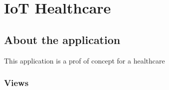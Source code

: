 
\chapter{IoT Healthcare} %

\label{IoT Healthcare} %


\section{About the application}

This application is a prof of concept for a healthcare 

\subsection{Views}

